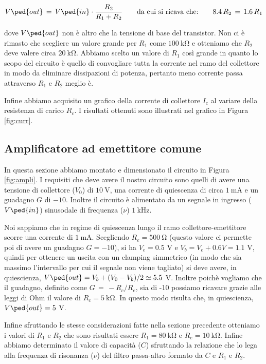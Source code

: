 \begin{equation}
	V\ped{out} \,=\, V\ped{in}\cdot\frac{R_2}{R_1+R_2} \qquad\text{da cui si ricava che:}\qquad 8.4\,R_2\,=\,1.6\,R_1
\end{equation}

dove $V\ped{out}$ non è altro che la tensione di base del transistor.
Non ci è rimasto che scegliere un valore grande per $R_1$ come $\SI{100}{\kilo\ohm}$ e otteniamo che $R_2$ deve valere circa $\SI{20}{\kilo\ohm}$. Abbiamo scelto un valore di $R_1$ così grande in quanto lo scopo del circuito è quello di convogliare tutta la corrente nel ramo del collettore in modo da eliminare dissipazioni di potenza, pertanto meno corrente passa attraverso $R_1$ e $R_2$ meglio è.

Infine abbiamo acquisito un grafico della corrente di collettore $I_c$ al variare della resistenza di carico $R_c$. I risultati ottenuti sono illustrati nel grafico in Figura \ref{fig:curr}.

\subsection*{Amplificatore ad emettitore comune}

In questa sezione abbiamo montato e dimensionato il circuito in Figura \ref{fig:ampli}. I requisiti che deve avere il nostro circuito sono quelli di avere una tensione di collettore ($V_0$) di $\SI{10}{\volt}$, una corrente di quiescenza di circa $\SI{1}{\milli\ampere}$ e un guadagno $G$ di $-10$. Inoltre il circuito è alimentato da un segnale in ingresso ($V\ped{in}$) sinusodale di frequenza ($\nu$) $\SI{1}{\kilo\hertz}$.

Noi sappiamo che in regime di quiescenza lungo il ramo collettore-emettitore scorre una corrente di $\SI{1}{\milli\ampere}$. Scegliendo $R_e = \SI{500}{\ohm}$ (questo valore ci permette poi di avere un guadagno $G = -10$), si ha $V_e = 0.5$ V e $V_b = V_e + 0.6 V  = 1.1$ V, quindi per ottenere un uscita con un clamping simmetrico (in modo che sia massimo l'intervallo per cui il segnale non viene tagliato) si deve avere, in quiescienza, $V\ped{out} = V_b + (V_0 - V_b)/2 \simeq 5.5$ V.
Inoltre poichè vogliamo che il guadagno, definito come $G\,=\,-R_c/R_e$, sia di -10 possiamo ricavare grazie alle leggi di Ohm il valore di $R_c = \SI{5}{\kilo\ohm}$. In questo modo risulta che, in quiescienza, $V\ped{out} = 5$ V.

Infine sfruttando le stesse considerazioni fatte nella sezione precedente otteniamo i valori di $R_1$ e $R_2$ che sono risultati essere $R_1=\SI{80}{\kilo\ohm}$ e $R_e=\SI{10}{\kilo\ohm}$.
Infine abbiamo determinato il valore di capacità ($C$) sfruttando la relazione che lo lega alla frequenza di risonanza ($\nu$) del filtro passa-altro formato da $C$ e $R_1$ e $R_2$.

